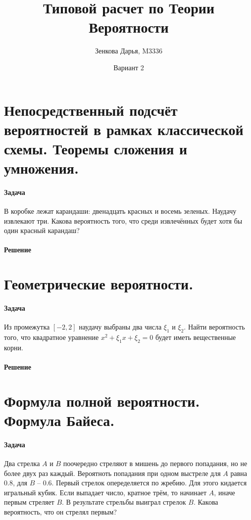 \documentclass{article}
\title{Типовой расчет по Теории Вероятности}
\author{Зенкова Дарья, M3336}
\date{Вариант 2}
\begin{document}
\maketitle
\newpage
{}

\section{Непосредственный подсчёт вероятностей в рамках классической схемы. Теоремы сложения и умножения.}

\paragraph{Задача}
В коробке лежат карандаши: двенадцать красных и восемь зеленых. Наудачу извлекают три. Какова вероятность того, что среди извлечённых будет хотя бы один красный карандаш?
\paragraph{Решение}
  
\section{Геометрические вероятности.}
\paragraph{Задача}
Из промежутка \({[{-2}, 2]}\) наудачу выбраны два числа \(\xi_1\) и \(\xi_2\). Найти вероятность того, что квадратное уравнение \(x^2+\xi_1x+\xi_2=0\) будет иметь вещественные корни.
\paragraph{Решение}
  
\section{Формула полной вероятности. Формула Байеса.}
\paragraph{Задача}
Два стрелка \(A\) и \(B\) поочередно стреляют в мишень до первого попадания, но не более двух раз каждый. Вероятноть попадания при одном выстреле для \(A\) равна \(0.8\), для \(B\) -- \(0.6\). Первый стрелок опеределяется по жребию. Для этого кидается игральный кубик. Если выпадает число, кратное трём, то начинает \(A\), иначе первым стреляет \(B\). В результате стрельбы выиграл стрелок \(B\). Какова вероятность, что он стрелял первым?
\end{document}
